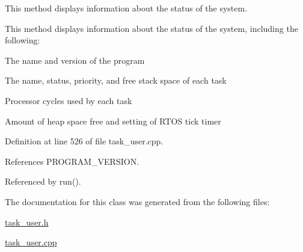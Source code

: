 This method displays information about the status of the system. 

This method displays information about the status of the system, including the following\-: \begin{DoxyItemize}
\item The name and version of the program \item The name, status, priority, and free stack space of each task \item Processor cycles used by each task \item Amount of heap space free and setting of R\-T\-O\-S tick timer \end{DoxyItemize}


Definition at line 526 of file task\-\_\-user.\-cpp.



References P\-R\-O\-G\-R\-A\-M\-\_\-\-V\-E\-R\-S\-I\-O\-N.



Referenced by run().



The documentation for this class was generated from the following files\-:\begin{DoxyCompactItemize}
\item 
\hyperlink{task__user_8h}{task\-\_\-user.\-h}\item 
\hyperlink{task__user_8cpp}{task\-\_\-user.\-cpp}\end{DoxyCompactItemize}
